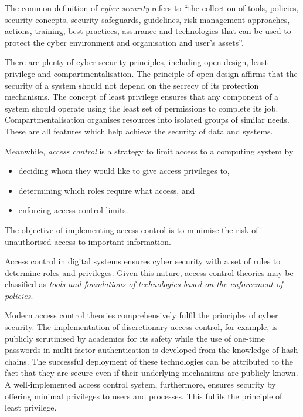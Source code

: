 \documentclass{article}
\begin{document}
The common definition of \textit{cyber security} refers to ``the collection
of tools, policies, security concepts, security safeguards, guidelines,
risk management approaches, actions, training, best practices, assurance
and technologies that can be used to protect the cyber environment and
organisation and user's assets''.\cite{itu}

There are plenty of cyber security principles, including open design, least
privilege and compartmentalisation.\cite{principles}\cite{computer-security}
The principle of open design affirms that the security of a system should
not depend on the secrecy of its protection mechanisms. The concept of least
privilege ensures that any component of a system should operate using the
least set of permissions to complete its job. Compartmentalisation organises
resources into isolated groups of similar needs. These are all features
which help achieve the security of data and systems.

Meanwhile, \textit{access control} is a strategy to limit access to a
computing system by\cite{access-control} \begin{itemize}
    \item deciding whom they would like to give access privileges to, \item
    determining which roles require what access, and \item enforcing access
    control limits.
\end{itemize} The objective of implementing access control is to minimise
the risk of unauthorised access to important information.

Access control in digital systems ensures cyber security with a set of rules
to determine roles and privileges. Given this nature, access control theories
may be classified as \textit{tools and foundations of technologies based on
the enforcement of policies}.

Modern access control theories comprehensively fulfil the principles of cyber
security. The implementation of discretionary access control, for example,
is publicly scrutinised by academics\cite{dac}\cite{safety-dac} for its
safety while the use of one-time passwords in multi-factor authentication is
developed from the knowledge of hash chains. The successful deployment of these
technologies can be attributed to the fact that they are secure even if their
underlying mechanisms are publicly known. A well-implemented access control
system, furthermore, ensures security by offering minimal privileges to users
and processes.\cite{crypto} This fulfils the principle of least privilege.
\end{document}
